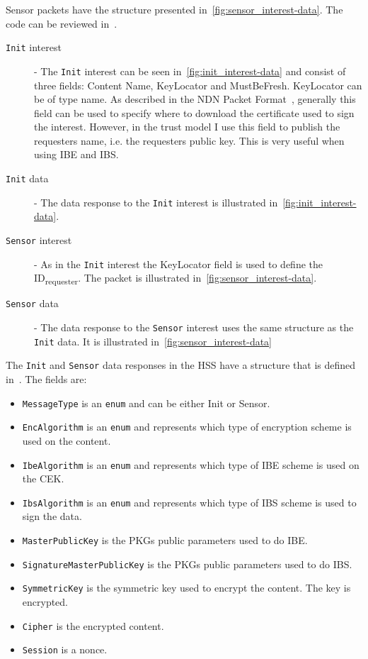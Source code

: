 Sensor packets have the structure presented in~\autoref{fig:sensor_interest-data}.
The code can be reviewed in~\cite[messageBuf.proto]{garseg15}.
\begin{description}
	\item[\texttt{Init} \gls{interest}] - 
  The \texttt{Init} \gls{interest} can be seen in~\autoref{fig:init_interest-data} and consist of three fields: Content Name, KeyLocator and MustBeFresh.
  KeyLocator can be of type \gls{name}. 
  As described in the \gls{NDN} Packet Format~\cite{ndnpacketformat}, generally this field can be used to specify where to download the certificate used to sign the \gls{interest}.
  However, in the trust model I use this field to publish the requesters \gls{name}, i.e. the requesters public key. 
  This is very useful when using \gls{IBE} and \gls{IBS}.
	\item[\texttt{Init} \gls{data}] - 
  The \gls{data} response to the \texttt{Init} \gls{interest} is illustrated in~\autoref{fig:init_interest-data}.
	\item[\texttt{Sensor} \gls{interest}] -
	As in the \texttt{Init} \gls{interest} the KeyLocator field is used to define the ID\textsubscript{requester}. 
  The packet is illustrated in~\autoref{fig:sensor_interest-data}.
	\item[\texttt{Sensor} \gls{data}] - 
  The \gls{data} response to the \texttt{Sensor} \gls{interest} uses the same structure as the \texttt{Init} \gls{data}. 
  It is illustrated in~\autoref{fig:sensor_interest-data}
\end{description}

The \texttt{Init} and \texttt{Sensor} \gls{data} responses in the \gls{HSS} have a structure that is defined in~\cite[messageBuf.proto]{garseg15}.
The fields are:
\begin{itemize}
  \item \texttt{MessageType} is an \texttt{enum} and can be either Init or Sensor.
  \item \texttt{EncAlgorithm} is an \texttt{enum} and represents which type of encryption scheme is used on the content.
  \item \texttt{IbeAlgorithm} is an \texttt{enum} and represents which type of \gls{IBE} scheme is used on the \gls{CEK}.
  \item \texttt{IbsAlgorithm} is an \texttt{enum} and represents which type of \gls{IBS} scheme is used to sign the \gls{data}.
  \item \texttt{MasterPublicKey} is the \gls{PKG}s public parameters used to do \gls{IBE}.
  \item \texttt{SignatureMasterPublicKey} is the \gls{PKG}s public parameters used to do \gls{IBS}.
  \item \texttt{SymmetricKey} is the symmetric key used to encrypt the content. The key is encrypted.
  \item \texttt{Cipher} is the encrypted content.
  \item \texttt{Session} is a nonce.
\end{itemize}

